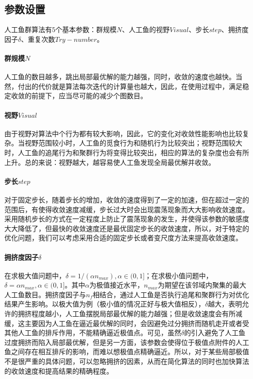 \documentclass[UTF8]{ctexart}
\begin{document}
		\subsection{参数设置}
			人工鱼群算法有5个基本参数：群规模$N$、人工鱼的视野$Visual$、步长$step$、拥挤度因子$\delta$、重复次数$Try-number$。
			\paragraph{群规模$N$}人工鱼的数目越多，跳出局部最优解的能力越强，同时，收敛的速度也越快。当然，付出的代价就是算法每次迭代的计算量也越大，因此，在使用过程中，满足稳定收敛的前提下，应当尽可能的减少个图数目。
			\paragraph{视野$Visual$}由于视野对算法中个行为都有较大影响，因此，它的变化对收敛性能影响也比较复杂。当视野范围较小时，人工鱼的觅食行为和随机行为比较突出；视野范围较大时，人工鱼的追尾行为和聚群行为将变得比较突出，相应的算法的复杂度也会有所上升。总的来说：视野越大，越容易使人工鱼发现全局最优解并收敛。
			\paragraph{步长$step$}对于固定步长，随着步长的增加，收敛的速度得到了一定的加速，但在超过一定的范围后，有使得收敛速度减缓，步长过大时会出现震荡现象而大大影响收敛速度。采用随机步长的方式在一定程度上防止了震荡现象的发生，并使得该参数的敏感度大大降低了，但最快的收敛速度还是最优固定步长的收敛速度，所以，对于特定的优化问题，我们可以考虑采用合适的固定步长或者变尺度方法来提高收敛速度。
			\paragraph{拥挤度因子$\delta$}在求极大值问题中，$\delta=1/(\alpha n_{max}), \alpha \in(0,1]$；在求极小值问题中，$\delta=\alpha n_{max}, \alpha \in(0,1]$。其中$\alpha$为极值接近水平，$n_{max}$为期望在该邻域内聚集的最大人工鱼数目。拥挤度因子与$n_f$相结合，通过人工鱼是否执行追尾和聚群行为对优化结果产生影响。以极大值为例（极小值的情况正好与极大值相反），$\delta$越大，表明允许的拥挤程度越小，人工鱼摆脱局部最优解的能力越强；但是收敛速度会有所减缓，这主要因为人工鱼在逼近最优解的同时，会因避免过分拥挤而随机走开或者受其他人工鱼的排斥作用，不能精确逼近极值点。可见，虽然$\delta$的引入避免了人工鱼过度拥挤而陷入局部最优解，但是另一方面，该参数会使得位于极值点附件的人工鱼之间存在相互排斥的影响，而难以想极值点精确逼近。所以，对于某些局部极值不是很严重的具体问题，可以忽略拥挤的因素，从而在简化算法的同时也加快算法的收敛速度和提高结果的精确程度。
\end{document}

